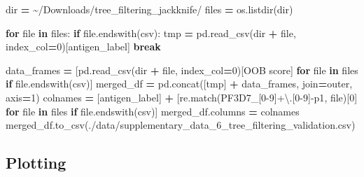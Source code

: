 \documentclass[
  11pt,
  oneside]{book}
\newenvironment{Shaded}{\begin{snugshade}}{\end{snugshade}}
\newcommand{\BuiltInTok}[1]{#1}
\newcommand{\ControlFlowTok}[1]{\textcolor[rgb]{0.13,0.29,0.53}{\textbf{#1}}}
\newcommand{\DecValTok}[1]{\textcolor[rgb]{0.00,0.00,0.81}{#1}}
\newcommand{\KeywordTok}[1]{\textcolor[rgb]{0.13,0.29,0.53}{\textbf{#1}}}
\newcommand{\NormalTok}[1]{#1}
\newcommand{\OperatorTok}[1]{\textcolor[rgb]{0.81,0.36,0.00}{\textbf{#1}}}
\newcommand{\StringTok}[1]{\textcolor[rgb]{0.31,0.60,0.02}{#1}}
\begin{document}
\begin{Shaded}
\begin{Highlighting}[]
\BuiltInTok{dir} \OperatorTok{=} \StringTok{\textquotesingle{}\textasciitilde{}/Downloads/tree\_filtering\_jackknife/\textquotesingle{}}
\NormalTok{files }\OperatorTok{=}\NormalTok{ os.listdir(}\BuiltInTok{dir}\NormalTok{)}

\ControlFlowTok{for} \BuiltInTok{file} \KeywordTok{in}\NormalTok{ files:}
    \ControlFlowTok{if} \BuiltInTok{file}\NormalTok{.endswith(}\StringTok{\textquotesingle{}csv\textquotesingle{}}\NormalTok{):}
\NormalTok{        tmp }\OperatorTok{=}\NormalTok{ pd.read\_csv(}\BuiltInTok{dir} \OperatorTok{+} \BuiltInTok{file}\NormalTok{, index\_col}\OperatorTok{=}\DecValTok{0}\NormalTok{)[}\StringTok{\textquotesingle{}antigen\_label\textquotesingle{}}\NormalTok{]}
        \ControlFlowTok{break}

\NormalTok{data\_frames }\OperatorTok{=}\NormalTok{ [pd.read\_csv(}\BuiltInTok{dir} \OperatorTok{+} \BuiltInTok{file}\NormalTok{, index\_col}\OperatorTok{=}\DecValTok{0}\NormalTok{)[}\StringTok{\textquotesingle{}OOB score\textquotesingle{}}\NormalTok{] }\ControlFlowTok{for} \BuiltInTok{file} \KeywordTok{in}\NormalTok{ files }\ControlFlowTok{if} \BuiltInTok{file}\NormalTok{.endswith(}\StringTok{\textquotesingle{}csv\textquotesingle{}}\NormalTok{)]}
\NormalTok{merged\_df }\OperatorTok{=}\NormalTok{ pd.concat([tmp] }\OperatorTok{+}\NormalTok{ data\_frames, join}\OperatorTok{=}\StringTok{\textquotesingle{}outer\textquotesingle{}}\NormalTok{, axis}\OperatorTok{=}\DecValTok{1}\NormalTok{)}
\NormalTok{colnames }\OperatorTok{=}\NormalTok{ [}\StringTok{\textquotesingle{}antigen\_label\textquotesingle{}}\NormalTok{] }\OperatorTok{+}\NormalTok{ [re.match(}\StringTok{\textquotesingle{}PF3D7\_[0{-}9]+\textbackslash{}.[0{-}9]{-}p1\textquotesingle{}}\NormalTok{, }\BuiltInTok{file}\NormalTok{)[}\DecValTok{0}\NormalTok{] }\ControlFlowTok{for} \BuiltInTok{file} \KeywordTok{in}\NormalTok{ files }\ControlFlowTok{if} \BuiltInTok{file}\NormalTok{.endswith(}\StringTok{\textquotesingle{}csv\textquotesingle{}}\NormalTok{)]}
\NormalTok{merged\_df.columns }\OperatorTok{=}\NormalTok{ colnames}
\NormalTok{merged\_df.to\_csv(}\StringTok{\textquotesingle{}./data/supplementary\_data\_6\_tree\_filtering\_validation.csv\textquotesingle{}}\NormalTok{)}
\end{Highlighting}
\end{Shaded}

\hypertarget{plotting-3}{%
\subsection{Plotting}\label{plotting-3}}
\end{document}
